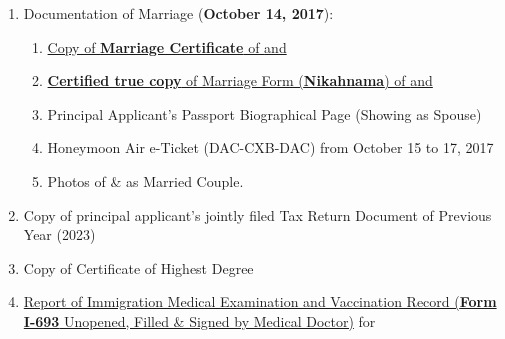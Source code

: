 \begin{enumerate}[label=\textbf{ Exhibit-\arabic*},start=15]
    \item Documentation of Marriage (\textbf{October 14, 2017}):
    \begin{enumerate}[label=\roman*.]
        \item \hyperref[exhibit12a]{Copy of \textbf{Marriage Certificate} of \textit{\pApplicant} and \textit{\dApplicant}}
        \item \hyperref[exhibit12b]{\textbf{Certified true copy} of Marriage Form (\textbf{Nikahnama}) of \textit{\pApplicant} and \textit{\dApplicant}}
        \item Principal Applicant's Passport Biographical Page (Showing \textit{\dApplicant} as Spouse)
        \item Honeymoon Air e-Ticket (DAC-CXB-DAC) from October 15 to 17, 2017
        \item Photos of \textit{\pApplicant} \& \textit{\dApplicant} as Married Couple.
    \end{enumerate}

    \item Copy of principal applicant's jointly filed Tax Return Document of Previous Year (2023)

    \item Copy of Certificate of Highest Degree
    \item \hyperref[exhibit14]{Report of Immigration Medical Examination and Vaccination Record (\textbf{Form I-693} Unopened, Filled \& Signed by Medical Doctor)} for \textit{\dApplicant}
\end{enumerate}